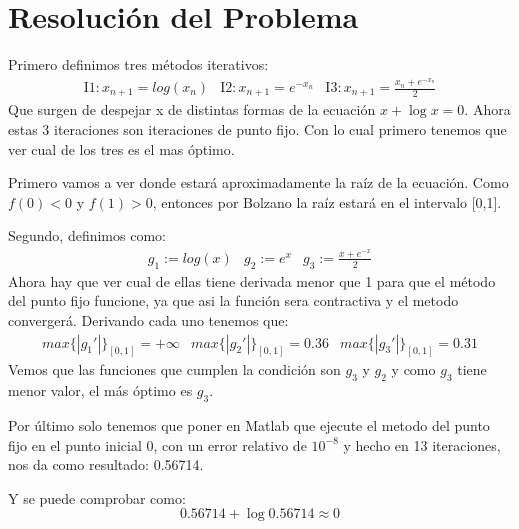 \documentclass[a4paper]{article}
\begin{document}
\section{Resolución del Problema}
Primero definimos tres métodos iterativos:
\begin{equation}
\begin{array}{ccc}
\mathrm{I1:}x_{n+1}=log(x_{n}) & \mathrm{I2:}x_{n+1}=e^{-x_{n}} & \mathrm{I3:}x_{n+1}=\frac{x_{n}+e^{-x_{n}}}{2}
\end{array}
\end{equation}
Que surgen de despejar x de distintas formas de la ecuación $x+\log{x}=0$. Ahora estas 3 iteraciones son iteraciones de punto fijo. Con lo cual primero tenemos que ver cual de los tres es el mas óptimo.

Primero vamos a ver donde estará aproximadamente la raíz de la ecuación. Como $f(0)<0$ y $f(1)>0$, entonces por Bolzano la raíz estará en el intervalo [0,1].

Segundo, definimos como:
\begin{equation}
\begin{array}{ccc}
g_{1}:=log(x) & g_{2}:=e^{x} & g_{3}:=\frac{x+e^{-x}}{2}
\end{array}
\end{equation}
Ahora hay que ver cual de ellas tiene derivada menor que 1 para que el método del punto fijo funcione, ya que asi la función sera contractiva y el metodo convergerá. Derivando cada uno tenemos que:
\begin{equation}
\begin{array}{ccc}
max\{|g_{1}'|\}_{[0,1]}=+\infty & max\{|g_{2}'|\}_{[0,1]}=0.36 & max\{|g_{3}'|\}_{[0,1]}=0.31
\end{array}
\end{equation}
Vemos que las funciones que cumplen la condición son $g_{3}$ y $g_{2}$ y como $g_{3}$ tiene menor valor, el más óptimo es $g_{3}$.

Por último solo tenemos que poner en Matlab que ejecute el metodo del punto fijo en el punto inicial 0, con un error relativo de $10^{-8}$ y hecho en 13 iteraciones, nos da como resultado: 0.56714.

Y se puede comprobar como:
\begin{equation*}
0.56714+\log{0.56714}\approx 0
\end{equation*}
\end{document}
